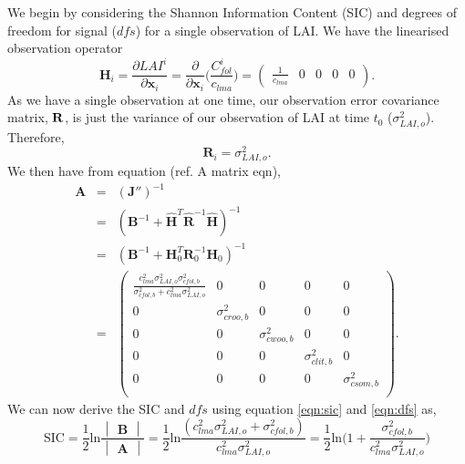 \documentclass[11pt]{article}
\begin{document}
We begin by considering the Shannon Information Content (SIC) and degrees of freedom for signal (\(dfs\)) for a single observation of LAI. We have the linearised observation operator
\begin{equation}
\textbf{H}_{i} = \frac{\partial LAI^{i}}{\partial \textbf{x}_{i}} = \frac{\partial}{\partial \textbf{x}_{i}} \bigg( \frac{C_{fol}^{i}}{c_{lma}} \bigg) =
\begin{pmatrix}
\frac{1}{c_{lma}} & 0 & 0 & 0 & 0
\end{pmatrix}.
\end{equation}
As we have a single observation at one time, our observation error covariance matrix, $\bf{R}$, is just the variance of our observation of LAI at time $t_0$ ($\sigma_{LAI,o}^{2}$). Therefore,
\begin{equation}
\mathbf{R}_i=\sigma_{LAI,o}^{2}.
\end{equation}
We then have from equation ({\color{red}ref. A matrix eqn}),
\begin{equation}
\begin{array} {lcl}
\mathbf{A} &=& (\mathbf{J}'')^{-1} \\
&=& (\mathbf{B}^{-1}+\hat{\mathbf{H}}^{T}\hat{\mathbf{R}}^{-1}\hat{\mathbf{H}})^{-1} \\
&=& (\mathbf{B}^{-1}+\mathbf{H}_0^{T}\mathbf{R}_0^{-1}\mathbf{H}_0)^{-1} \\
&=& \begin{pmatrix} 
\frac{c_{lma}^2 \sigma_{LAI,o}^2 \sigma_{cfol,b}^2}{\sigma_{cfol,b}^2 + c_{lma}^2 \sigma_{LAI,o}^2} & 0 & 0 & 0 & 0 \\
0 & \sigma_{croo,b}^{2} & 0 & 0 & 0 \\
0 & 0 & \sigma_{cwoo,b}^{2} & 0 & 0 \\
0 & 0 & 0 & \sigma_{clit,b}^{2} & 0 \\
0 & 0 & 0 & 0 & \sigma_{csom,b}^{2} \\
\end{pmatrix}.
\end{array}
\end{equation} 
We can now derive the SIC and $dfs$ using equation \eqref{eqn:sic} and \eqref{eqn:dfs} as,
\begin{equation}
\text{SIC} = \frac{1}{2}\text{ln}\frac{\begin{vmatrix} \mathbf{B} \end{vmatrix}}{\begin{vmatrix} \mathbf{A} \end{vmatrix}} = \frac{1}{2}\text{ln}\frac{(c_{lma}^2 \sigma_{LAI,o}^{2}+\sigma_{cfol,b}^{2})}{c_{lma}^2 \sigma_{LAI,o}^{2}}
=\frac{1}{2}\text{ln} \bigg(1+\frac{\sigma_{cfol,b}^{2}}{c_{lma}^2 \sigma_{LAI,o}^{2}}\bigg) \label{eqn:siclai}
\end{equation}
\end{document}
